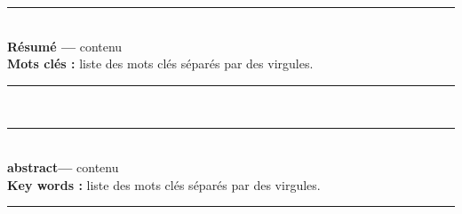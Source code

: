 \noindent\rule[2pt]{\textwidth}{0.5pt}\\
{\textbf{Résumé ---}}
contenu\\
{\textbf{Mots clés :}}
liste des mots clés séparés par des virgules.
\\
\noindent\rule[2pt]{\textwidth}{0.5pt}\\[2cm]
\noindent\rule[2pt]{\textwidth}{0.5pt}\\
{\textbf{abstract---}}
contenu\\
{\textbf{Key words :}}
liste des mots clés séparés par des virgules.
\\
\noindent\rule[2pt]{\textwidth}{0.5pt} 
